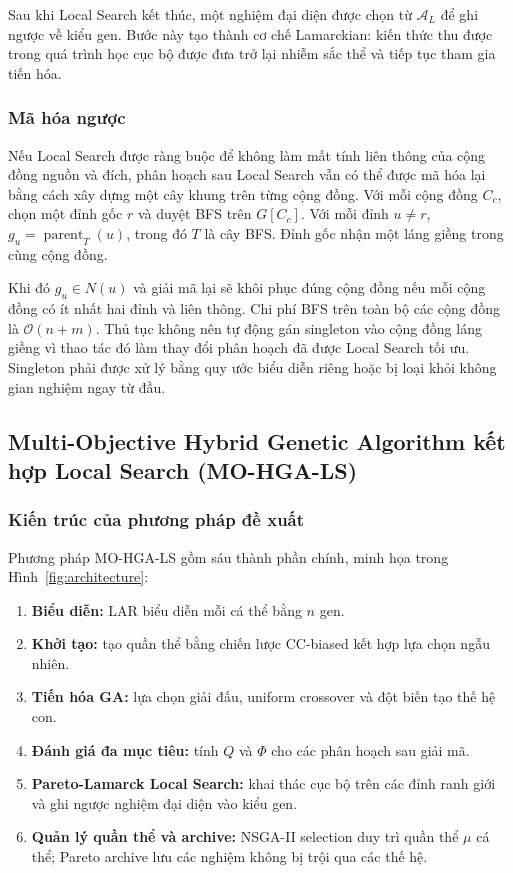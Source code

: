 \documentclass[14pt,a4paper]{extarticle}
\begin{document}
Sau khi Local Search kết thúc, một nghiệm đại diện được chọn từ $\mathcal{A}_L$ để ghi ngược về kiểu gen. Bước này tạo thành cơ chế Lamarckian: kiến thức thu được trong quá trình học cục bộ được đưa trở lại nhiễm sắc thể và tiếp tục tham gia tiến hóa.

\subsubsection{Mã hóa ngược}

Nếu Local Search được ràng buộc để không làm mất tính liên thông của cộng đồng nguồn và đích, phân hoạch sau Local Search vẫn có thể được mã hóa lại bằng cách xây dựng một cây khung trên từng cộng đồng. Với mỗi cộng đồng $C_c$, chọn một đỉnh gốc $r$ và duyệt BFS trên $G[C_c]$. Với mỗi đỉnh $u\neq r$,
$g_u=\operatorname{parent}_{T}(u)$, 
trong đó $T$ là cây BFS. Đỉnh gốc nhận một láng giềng trong cùng cộng đồng.

Khi đó $g_u\in N(u)$ và giải mã lại sẽ khôi phục đúng cộng đồng nếu mỗi cộng đồng có ít nhất hai đỉnh và liên thông. Chi phí BFS trên toàn bộ các cộng đồng là
$\mathcal{O}(n+m)$.
Thủ tục không nên tự động gán singleton vào cộng đồng láng giềng vì thao tác đó làm thay đổi phân hoạch đã được Local Search tối ưu. Singleton phải được xử lý bằng quy ước biểu diễn riêng hoặc bị loại khỏi không gian nghiệm ngay từ đầu.


\subsection[Multi-Objective Hybrid Genetic Algorithm\\kết hợp Local Search]{Multi-Objective Hybrid Genetic Algorithm kết hợp Local Search (MO-HGA-LS)}

\subsubsection{Kiến trúc của phương pháp đề xuất}
Phương pháp MO-HGA-LS gồm sáu thành phần chính, minh họa trong Hình~\ref{fig:architecture}:
\begin{enumerate}
    \item \textbf{Biểu diễn:} LAR biểu diễn mỗi cá thể bằng $n$ gen.
    \item \textbf{Khởi tạo:} tạo quần thể bằng chiến lược CC-biased kết hợp lựa chọn ngẫu nhiên.
    \item \textbf{Tiến hóa GA:} lựa chọn giải đấu, uniform crossover và đột biến tạo thế hệ con.
    \item \textbf{Đánh giá đa mục tiêu:} tính $Q$ và $\Phi$ cho các phân hoạch sau giải mã.
    \item \textbf{Pareto-Lamarck Local Search:} khai thác cục bộ trên các đỉnh ranh giới và ghi ngược nghiệm đại diện vào kiểu gen.
    \item \textbf{Quản lý quần thể và archive:} NSGA-II selection duy trì quần thể $\mu$ cá thể; Pareto archive lưu các nghiệm không bị trội qua các thế hệ.
\end{enumerate}
\end{document}
